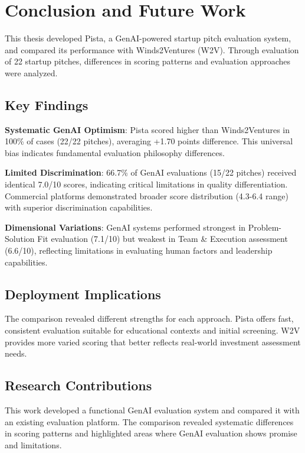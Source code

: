 \chapter{Conclusion and Future Work}
\label{ch:conclusion}

This thesis developed Pista, a GenAI-powered startup pitch evaluation system, and compared its performance with Winds2Ventures (W2V). Through evaluation of 22 startup pitches, differences in scoring patterns and evaluation approaches were analyzed.

\section{Key Findings}
\label{sec:key-findings}

\textbf{Systematic GenAI Optimism}: Pista scored higher than Winds2Ventures in 100\% of cases (22/22 pitches), averaging +1.70 points difference. This universal bias indicates fundamental evaluation philosophy differences.

\textbf{Limited Discrimination}: 66.7\% of GenAI evaluations (15/22 pitches) received identical 7.0/10 scores, indicating critical limitations in quality differentiation. Commercial platforms demonstrated broader score distribution (4.3-6.4 range) with superior discrimination capabilities.

\textbf{Dimensional Variations}: GenAI systems performed strongest in Problem-Solution Fit evaluation (7.1/10) but weakest in Team \& Execution assessment (6.6/10), reflecting limitations in evaluating human factors and leadership capabilities.

\section{Deployment Implications}
\label{sec:applications}

The comparison revealed different strengths for each approach. Pista offers fast, consistent evaluation suitable for educational contexts and initial screening. W2V provides more varied scoring that better reflects real-world investment assessment needs.

\section{Research Contributions}
\label{sec:contributions}

This work developed a functional GenAI evaluation system and compared it with an existing evaluation platform. The comparison revealed systematic differences in scoring patterns and highlighted areas where GenAI evaluation shows promise and limitations.

